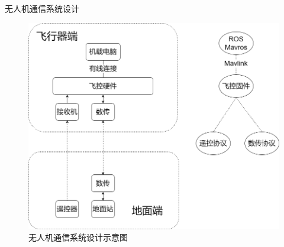 \begin{frame}[fragile]{无人机通信系统设计}
  \begin{figure}[H]
    \centering
    \includegraphics[height=0.7\textheight]{figures/communication_system.png}
    \caption{无人机通信系统设计示意图}
  \end{figure}
\end{frame}


